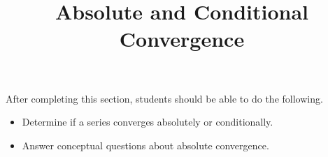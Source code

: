 \documentclass{ximera}
\title{Absolute and Conditional Convergence}
\begin{document}
\begin{abstract}
\end{abstract}

\maketitle

\begin{sectionOutcomes}

After completing this section, students should be able to do the following.

\begin{itemize}
\item Determine if a series converges absolutely or conditionally.
\item Answer conceptual questions about absolute convergence.
\end{itemize}

\end{sectionOutcomes}
\end{document}
